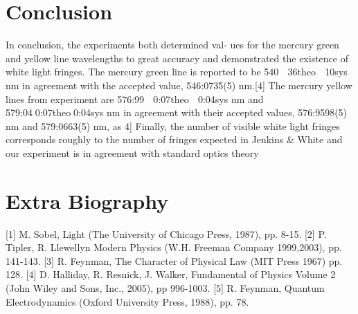 \documentclass[12pt,twocolumn]{article}
\begin{document}
\section{Conclusion}
In conclusion, the experiments both determined val-
ues for the mercury green and yellow line wavelengths
to great accuracy and demonstrated the existence of
white light fringes. The mercury green line is reported
to be 540  36theo  10sys nm in agreement with the
accepted value, 546:0735(5) nm.[4] The mercury yellow
lines from experiment are 576:99  0:07theo  0:04sys nm
and 579:040:07theo0:04sys nm in agreement with their
accepted values, 576:9598(5) nm and 579:0663(5) nm, as
4] Finally, the number of visible white light fringes
corresponds roughly to the number of fringes expected
in Jenkins & White and our experiment is in agreement
with standard optics theory
\nocite{*}


\section{Extra Biography}
[1] M. Sobel, Light (The University of Chicago Press, 1987), pp. 8-15.
[2] P. Tipler, R. Llewellyn Modern Physics (W.H. Freeman Company 1999,2003), pp. 141-143.
[3] R. Feynman, The Character of Physical Law (MIT Press 1967) pp. 128.
[4] D. Halliday, R. Resnick, J. Walker, Fundamental of Physics Volume 2 (John Wiley and Sons,
Inc., 2005), pp 996-1003.
[5] R. Feynman, Quantum Electrodynamics (Oxford University Press, 1988), pp. 78.
\end{document}
